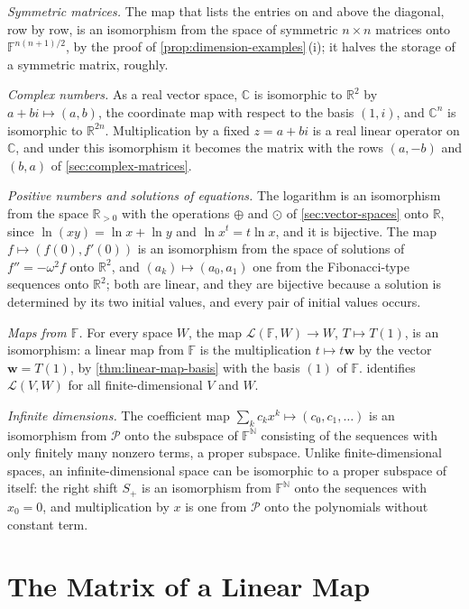 \emph{Symmetric matrices.} The map that lists the entries on and above the diagonal, row by row, is an isomorphism from the space of symmetric $n\times n$ matrices onto $\mathbb F^{n(n+1)/2}$, by the proof of \cref{prop:dimension-examples}\,(i); it halves the storage of a symmetric matrix, roughly.

\emph{Complex numbers.} As a real vector space, $\mathbb C$ is isomorphic to $\mathbb R^2$ by $a+bi\mapsto(a,b)$, the coordinate map with respect to the basis $(1,i)$, and $\mathbb C^n$ is isomorphic to $\mathbb R^{2n}$. Multiplication by a fixed $z=a+bi$ is a real linear operator on $\mathbb C$, and under this isomorphism it becomes the matrix with the rows $(a,-b)$ and $(b,a)$ of \cref{sec:complex-matrices}.

\emph{Positive numbers and solutions of equations.} The logarithm is an isomorphism from the space $\mathbb R_{>0}$ with the operations $\oplus$ and $\odot$ of \cref{sec:vector-spaces} onto $\mathbb R$, since $\ln(xy)=\ln x+\ln y$ and $\ln x^t=t\ln x$, and it is bijective. The map $f\mapsto(f(0),f'(0))$ is an isomorphism from the space of solutions of $f''=-\omega^2f$ onto $\mathbb R^2$, and $(a_k)\mapsto(a_0,a_1)$ one from the Fibonacci-type sequences onto $\mathbb R^2$; both are linear, and they are bijective because a solution is determined by its two initial values, and every pair of initial values occurs.

\emph{Maps from $\mathbb F$.} For every space $W$, the map $\mathcal L(\mathbb F,W)\to W$, $T\mapsto T(1)$, is an isomorphism: a linear map from $\mathbb F$ is the multiplication $t\mapsto t\mathbf w$ by the vector $\mathbf w=T(1)$, by \cref{thm:linear-map-basis} with the basis $(1)$ of $\mathbb F$.  identifies $\mathcal L(V,W)$ for all finite-dimensional $V$ and $W$.

\emph{Infinite dimensions.} The coefficient map $\sum_kc_kx^k\mapsto(c_0,c_1,\ldots)$ is an isomorphism from $\mathcal P$ onto the subspace of $\mathbb F^{\mathbb N}$ consisting of the sequences with only finitely many nonzero terms, a proper subspace. Unlike finite-dimensional spaces, an infinite-dimensional space can be isomorphic to a proper subspace of itself: the right shift $S_+$ is an isomorphism from $\mathbb F^{\mathbb N}$ onto the sequences with $x_0=0$, and multiplication by $x$ is one from $\mathcal P$ onto the polynomials without constant term.

\section{The Matrix of a Linear Map}
\label{sec:matrix-of-map}

